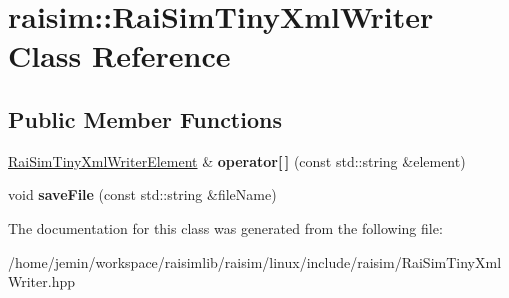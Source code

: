 \hypertarget{classraisim_1_1RaiSimTinyXmlWriter}{}\section{raisim\+:\+:Rai\+Sim\+Tiny\+Xml\+Writer Class Reference}
\label{classraisim_1_1RaiSimTinyXmlWriter}
\subsection*{Public Member Functions}
\begin{DoxyCompactItemize}
\item 
\mbox{\label{classraisim_1_1RaiSimTinyXmlWriter_a8c597a00885f5d797a40303dafde86cf}} 
\hyperlink{classraisim_1_1RaiSimTinyXmlWriterElement}{Rai\+Sim\+Tiny\+Xml\+Writer\+Element} \& {\bfseries operator\mbox{[}$\,$\mbox{]}} (const std\+::string \&element)
\item 
\mbox{\label{classraisim_1_1RaiSimTinyXmlWriter_aab82d721544f25af9900db0a226b83e1}} 
void {\bfseries save\+File} (const std\+::string \&file\+Name)
\end{DoxyCompactItemize}


The documentation for this class was generated from the following file\+:\begin{DoxyCompactItemize}
\item 
/home/jemin/workspace/raisimlib/raisim/linux/include/raisim/Rai\+Sim\+Tiny\+Xml\+Writer.\+hpp\end{DoxyCompactItemize}
